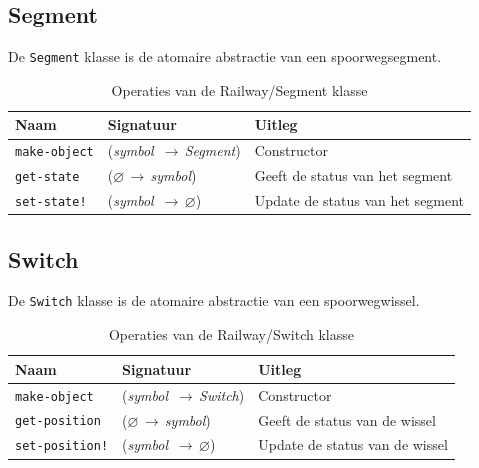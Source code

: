 \documentclass[a4paper, 11pt]{article}
\newcommand{\naar}{\,$\rightarrow$\,}
\renewcommand{\empty}{$\varnothing$}
\newcommand{\<}{\scriptsize\textless\normalsize}
\renewcommand{\>}{\scriptsize\textgreater\normalsize}
\begin{document}
\subsection{Segment} %
De \texttt{Segment} klasse is de atomaire abstractie van een spoorwegsegment.
\begin{table}[H]
	\begin{center}
		\begin{tabular}{|l l l|}
			\hline
			\textbf{Naam} & \textbf{Signatuur} & \textbf{Uitleg}\\
			\hline
			\texttt{make-object} & (\textit{symbol} \naar \textit{Segment}) & Constructor\\
			\hline
			\texttt{get-state} & (\empty \naar \textit{symbol}) & Geeft de status van het segment\\
			\texttt{set-state!} & (\textit{symbol} \naar \empty) & Update de status van het segment\\
			\hline
		\end{tabular}
		\caption{Operaties van de Railway/Segment klasse}
	\end{center}
\end{table}

\subsection{Switch} %
De \texttt{Switch} klasse is de atomaire abstractie van een spoorwegwissel.
\begin{table}[H]
	\begin{center}
		\begin{tabular}{|l l l|}
			\hline
			\textbf{Naam} & \textbf{Signatuur} & \textbf{Uitleg}\\
			\hline
			\texttt{make-object} & (\textit{symbol} \naar \textit{Switch}) & Constructor\\
			\hline
			\texttt{get-position} & (\empty \naar \textit{symbol}) & Geeft de status van de wissel\\
			\texttt{set-position!} & (\textit{symbol} \naar \empty) & Update de status van de wissel\\
			\hline
		\end{tabular}
		\caption{Operaties van de Railway/Switch klasse}
	\end{center}
\end{table}

\newpage
\end{document}
